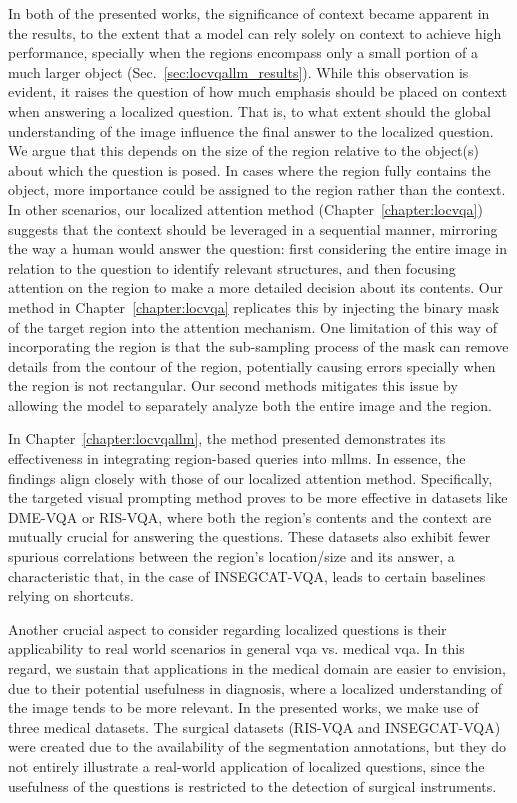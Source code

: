 In both of the presented works, the significance of context became apparent in the results, to the extent that a model can rely solely on context to achieve high performance, specially when the regions encompass only a small portion of a much larger object (Sec.~\ref{sec:locvqallm_results}). While this observation is evident, it raises the question of how much emphasis should be placed on context when answering a localized question. That is, to what extent should the global understanding of the image influence the final answer to the localized question. We argue that this depends on the size of the region relative to the object(s) about which the question is posed. In cases where the region fully contains the object, more importance could be assigned to the region rather than the context. In other scenarios, our localized attention method (Chapter~\ref{chapter:locvqa}) suggests that the context should be leveraged in a sequential manner, mirroring the way a human would answer the question: first considering the entire image in relation to the question to identify relevant structures, and then focusing attention on the region to make a more detailed decision about its contents. Our method in Chapter~\ref{chapter:locvqa} replicates this by injecting the binary mask of the target region into the attention mechanism. One limitation of this way of incorporating the region is that the sub-sampling process of the mask can remove details from the contour of the region, potentially causing errors specially when the region is not rectangular. Our second methods mitigates this issue by allowing the model to separately analyze both the entire image and the region. 

In Chapter~\ref{chapter:locvqallm}, the method presented demonstrates its effectiveness in integrating region-based queries into \glspl{mllm}. In essence, the findings align closely with those of our localized attention method. Specifically, the targeted visual prompting method proves to be more effective in datasets like DME-VQA or RIS-VQA, where both the region's contents and the context are mutually crucial for answering the questions. These datasets also exhibit fewer spurious correlations between the region's location/size and its answer, a characteristic that, in the case of INSEGCAT-VQA, leads to certain baselines relying on shortcuts.

Another crucial aspect to consider regarding localized questions is their applicability to real world scenarios in general \gls{vqa} vs. medical \gls{vqa}. In this regard, we sustain that applications in the medical domain are easier to envision, due to their potential usefulness in diagnosis, where a localized understanding of the image tends to be more relevant. In the presented works, we make use of three medical datasets. The surgical datasets (RIS-VQA and INSEGCAT-VQA) were created due to the availability of the segmentation annotations, but they do not entirely illustrate a real-world application of localized questions, since the usefulness of the questions is restricted to the detection of surgical instruments. 

